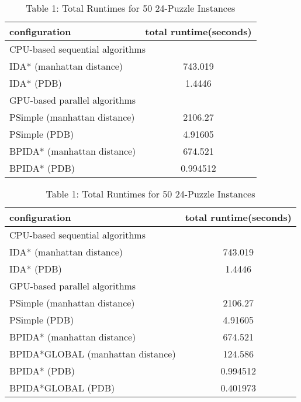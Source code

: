 \documentclass[a4paper,11pt,oneside,openany]{jsbook}
\begin{document}
\begin{table}[]
\centering
\caption{Table 1: Total Runtimes for 50 24-Puzzle Instances}
\label{my-label}
\begin{tabular}{|l|c|}
\hline
configuration & \multicolumn{1}{l|}{total runtime(seconds)} \\ \hline
\multicolumn{2}{|l|}{CPU-based sequential algorithms} \\ \hline
IDA* (manhattan distance) & 743.019 \\
IDA* (PDB) & 1.4446 \\ \hline
\multicolumn{2}{|l|}{GPU-based parallel algorithms} \\ \hline
PSimple (manhattan distance) & 2106.27 \\
PSimple (PDB) & 4.91605 \\
BPIDA* (manhattan distance) & 674.521 \\
BPIDA* (PDB) & 0.994512 \\ \hline
\end{tabular}
\end{table}

\begin{table}[]
\centering
\caption{Table 1: Total Runtimes for 50 24-Puzzle Instances}
\label{my-label}
\begin{tabular}{|l|c|}
\hline
configuration & \multicolumn{1}{l|}{total runtime(seconds)} \\ \hline
\multicolumn{2}{|l|}{CPU-based sequential algorithms} \\ \hline
IDA* (manhattan distance) & 743.019 \\
IDA* (PDB) & 1.4446 \\ \hline
\multicolumn{2}{|l|}{GPU-based parallel algorithms} \\ \hline
PSimple (manhattan distance) & 2106.27 \\
PSimple (PDB) & 4.91605 \\
BPIDA* (manhattan distance) & 674.521 \\
BPIDA*GLOBAL (manhattan distance) & 124.586 \\
BPIDA* (PDB) & 0.994512 \\
BPIDA*GLOBAL (PDB) & 0.401973 \\ \hline
\end{tabular}
\end{table}
\end{document}
